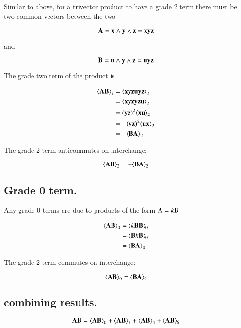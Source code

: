 \documentclass{article}      %
\newcommand{\gpgrade}[2] {{\left\langle{{#1}}\right\rangle}_{#2}}
\begin{document}
Similar to above, 
for a trivector product to have a grade 2 term there must be two common
vectors between the two

\[
\mathbf{A} = \mathbf{x} \wedge \mathbf{y} \wedge \mathbf{z} = \mathbf{x}\mathbf{y}\mathbf{z}
\]

and

\[
\mathbf{B} = \mathbf{u} \wedge \mathbf{y} \wedge \mathbf{z} =\mathbf{u}\mathbf{y}\mathbf{z}
\]

The grade two term of the product is

\begin{align*}
\gpgrade{\BA \BB}{2}
&= \gpgrade{ \Bx\By\Bz \Bu\By\Bz }{2} \\
&= \gpgrade{ \Bx\By\Bz \By\Bz \Bu}{2} \\
&= (\By\Bz)^2\gpgrade{ \Bx \Bu}{2} \\
&= -(\By\Bz)^2\gpgrade{ \Bu \Bx}{2} \\
&= -\gpgrade{ \BB \BA }{2} \\
\end{align*}

The grade 2 term anticommutes on interchange:

\begin{equation}\label{eqn:trivecgpgrade2}
\gpgrade{\BA\BB}{2} = -\gpgrade{\BB\BA}{2}
\end{equation}

\subsection{ Grade 0 term. }

Any grade 0 terms are due to products of the form $\mathbf{A} = k\mathbf{B}$

\begin{align*}
\gpgrade{\BA \BB}{0}
&= \gpgrade{k\BB \BB}{0} \\
&= \gpgrade{\BB k\BB}{0} \\
&= \gpgrade{\BB \BA}{0} \\
\end{align*}

The grade 2 term commutes on interchange:

\begin{equation}\label{eqn:trivecgpgrade0}
\gpgrade{\BA\BB}{0} = \gpgrade{\BB\BA}{0}
\end{equation}

\subsection{ combining results. }

\begin{equation*}
\BA \BB
=\gpgrade{\BA\BB}{0}
+\gpgrade{\BA\BB}{2}
+\gpgrade{\BA\BB}{4}
+\gpgrade{\BA\BB}{6}
\end{equation*}
\end{document}
